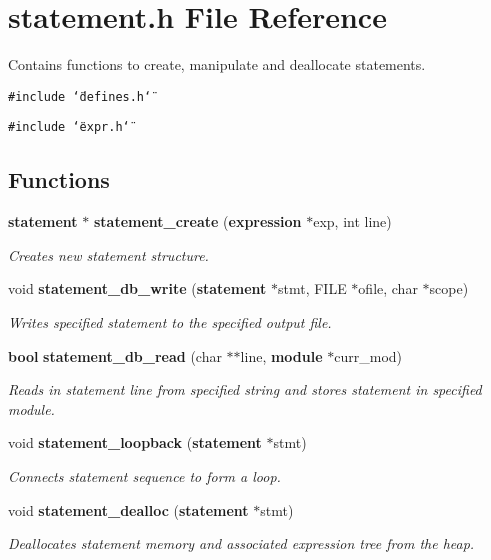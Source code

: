 \section{statement.h File Reference}
\label{statement_8h}
Contains functions to create, manipulate and deallocate statements. 


{\tt \#include \char`\"{}defines.h\char`\"{}}\par
{\tt \#include \char`\"{}expr.h\char`\"{}}\par
\subsection*{Functions}
\begin{CompactItemize}
\item 
{\bf statement} $\ast$ {\bf statement\_\-create} ({\bf expression} $\ast$exp, int line)
\begin{CompactList}\small\item\em Creates new statement structure.\item\end{CompactList}\item 
void {\bf statement\_\-db\_\-write} ({\bf statement} $\ast$stmt, FILE $\ast$ofile, char $\ast$scope)
\begin{CompactList}\small\item\em Writes specified statement to the specified output file.\item\end{CompactList}\item 
{\bf bool} {\bf statement\_\-db\_\-read} (char $\ast$$\ast$line, {\bf module} $\ast$curr\_\-mod)
\begin{CompactList}\small\item\em Reads in statement line from specified string and stores statement in specified module.\item\end{CompactList}\item 
void {\bf statement\_\-loopback} ({\bf statement} $\ast$stmt)
\begin{CompactList}\small\item\em Connects statement sequence to form a loop.\item\end{CompactList}\item 
void {\bf statement\_\-dealloc} ({\bf statement} $\ast$stmt)
\begin{CompactList}\small\item\em Deallocates statement memory and associated expression tree from the heap.\item\end{CompactList}\end{CompactItemize}



